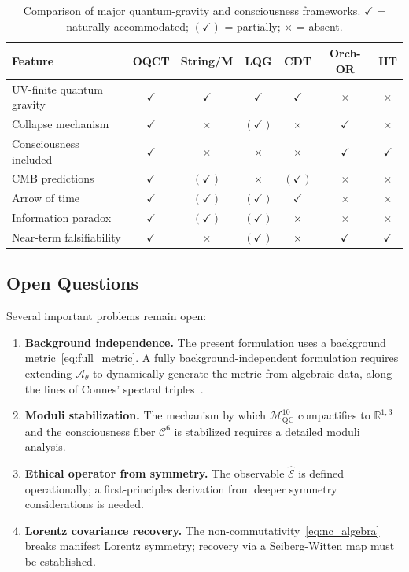 \documentclass[12pt,a4paper]{article}
\theoremstyle{myrmk}
\newcommand{\Mmanifold}{\mathcal{M}^{10}_{\mathrm{QC}}}
\newcommand{\cC}{\mathcal{C}^{6}}
\begin{document}
\begin{table}[H]
\centering
\caption{Comparison of major quantum-gravity and consciousness frameworks.
$\checkmark$ = naturally accommodated; $(\checkmark)$ = partially; $\times$ = absent.}
\label{tab:comparison}
\renewcommand{\arraystretch}{1.3}
\begin{tabular}{lcccccc}
\toprule
\textbf{Feature} & \textbf{OQCT} & \textbf{String/M} & \textbf{LQG} & \textbf{CDT}
  & \textbf{Orch-OR} & \textbf{IIT} \\
\midrule
UV-finite quantum gravity  & $\checkmark$ & $\checkmark$ & $\checkmark$ & $\checkmark$ & $\times$ & $\times$ \\
Collapse mechanism         & $\checkmark$ & $\times$      & $(\checkmark)$& $\times$    & $\checkmark$ & $\times$ \\
Consciousness included     & $\checkmark$ & $\times$      & $\times$     & $\times$    & $\checkmark$ & $\checkmark$ \\
CMB predictions            & $\checkmark$ & $(\checkmark)$& $\times$     & $(\checkmark)$& $\times$ & $\times$ \\
Arrow of time              & $\checkmark$ & $(\checkmark)$& $(\checkmark)$& $\checkmark$& $\times$ & $\times$ \\
Information paradox        & $\checkmark$ & $(\checkmark)$& $(\checkmark)$& $\times$   & $\times$ & $\times$ \\
Near-term falsifiability   & $\checkmark$ & $\times$      & $(\checkmark)$& $\times$   & $\checkmark$ & $\checkmark$ \\
\bottomrule
\end{tabular}
\end{table}

\subsection{Open Questions}

Several important problems remain open:

\begin{enumerate}[label=(\roman*),leftmargin=*]
  \item \textbf{Background independence.} The present formulation uses a background
    metric~\eqref{eq:full_metric}. A fully background-independent formulation requires
    extending $\mathcal{A}_\theta$ to dynamically generate the metric from algebraic
    data, along the lines of Connes' spectral triples~\cite{Connes1994}.
  \item \textbf{Moduli stabilization.} The mechanism by which $\Mmanifold$ compactifies
    to $\mathbb{R}^{1,3}$ and the consciousness fiber $\cC$ is stabilized requires a
    detailed moduli analysis.
  \item \textbf{Ethical operator from symmetry.} The observable $\hat{\mathcal{E}}$ is
    defined operationally; a first-principles derivation from deeper symmetry
    considerations is needed.
  \item \textbf{Lorentz covariance recovery.} The non-commutativity~\eqref{eq:nc_algebra}
    breaks manifest Lorentz symmetry; recovery via a Seiberg-Witten map must be established.
\end{enumerate}
\end{document}
